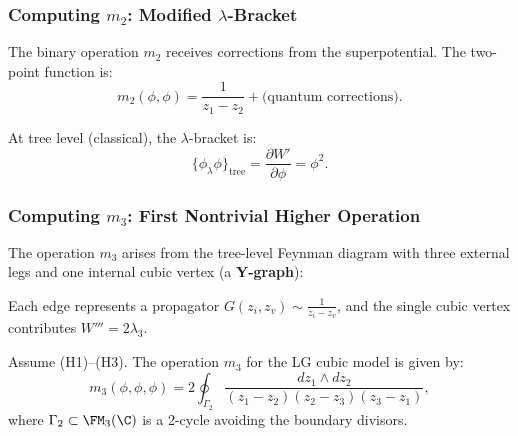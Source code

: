 \subsubsection{Computing $m_2$: Modified $\lambda$-Bracket}

The binary operation $m_2$ receives corrections from the superpotential. The two-point function is:
\begin{equation}
m_2(\phi, \phi) = \frac{1}{z_1 - z_2} + \text{(quantum corrections)}.
\end{equation}

At tree level (classical), the $\lambda$-bracket is:
\begin{equation}
\{\phi_\lambda \phi\}_{\text{tree}} = \frac{\partial W'}{\partial \phi} = \phi^2.
\end{equation}

\subsubsection{Computing $m_3$: First Nontrivial Higher Operation}

The operation $m_3$ arises from the tree-level Feynman diagram with three external legs and one internal cubic vertex (a \textbf{Y-graph}):

\begin{center}
\end{center}

Each edge represents a propagator $G(z_i, z_v) \sim \frac{1}{z_i - z_v}$, and the single cubic vertex contributes $W''' = 2\lambda_3$.

\begin{proposition}
Assume \textrm{(H1)--(H3)}.
The operation $m_3$ for the LG cubic model is given by:
\begin{equation}
m_3(\phi, \phi, \phi) = 2 \oint_{\Gamma_2} \frac{dz_1 \wedge dz_2}{(z_1 - z_2)(z_2 - z_3)(z_3 - z_1)},
\end{equation}
where $\Gamma_2 \subset \FM_3(\C)$ is a 2-cycle avoiding the boundary divisors.
\end{proposition}

